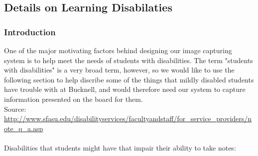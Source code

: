 \documentclass[]{article}
\begin{document}
\subsection*{Details on Learning Disabilaties}
        \subsubsection*{Introduction}
One of the major motivating factors behind designing our image capturing system is to help meet the needs of students with disabilities. The term "students with disabilities" is a very broad term, however, so we would like to use the following section to help discribe some of the things that mildly disabled students have trouble with at Bucknell, and would therefore need our system to capture information presented on the board for them.
\\
Source: \\
{\color{red} \url{http://www.sfasu.edu/disabilityservices/facultyandstaff/for_service_providers/note_q_a.asp}} \\
\\
Disabilities that students might have that impair their ability to take notes:
\end{document}
